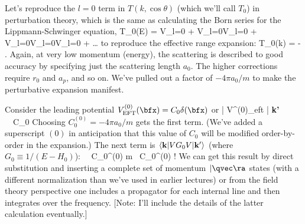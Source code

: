 Let's reproduce the $l=0$ term in $T(k,\cos\theta)$ (which we'll call $T_0$) 
in perturbation theory,
which is the same as calculating
the Born series for the Lippmann-Schwinger equation,
\beq
   T_0(E) = V_{l=0} + V_{l=0}V_{l=0} 
   + V_{l=0}V_{l=0}V_{l=0} + \ldots
\eeq
to reproduce the effective range expansion:
%
\beq 
   T_0(k) = -  \;.
\eeq
Again, at very low momentum (energy), the scattering is described to
good accuracy by specifying just the scattering length $a_0$.
The higher corrections require $r_0$ and $a_p$, and so on.
We've pulled out a factor of $-4\pi a_0/m$ to make the perturbative
expansion manifest.

Consider the leading potential
$V^{(0)}_{\rm EFT}(\bfx) = C_0 \delta(\bfx)$ or
\beq
  | V^{(0)}_{\rm eft} | {\bf k'}\rangle
  \ \Longrightarrow\
 \ \Longrightarrow\ C_0
\eeq
Choosing $C_0^{(0)} = -4\pi a_0/m$ gets the first term. 
(We've added a superscript $(0)$ in anticipation that this value of
$C_0$ will be modified order-by-order in the expansion.) 
The next term is  
      $\langle {\bf k} | VG_0V | {\bf k'}\rangle$ (where
      $G_0 \equiv 1/(E-H_0)$):
\beq
{}
 \ \Longrightarrow\ 
C_0^{(0)} m \int\! \frac{d^3q}{(2\pi)^3} \, C_0^{(0)}
   \longrightarrow \infty!
   \label{eq:C0sq_bare}
\eeq
We can get this result by direct substitution and inserting a complete
set of momentum $|\qvec\ra$ states (with a different normalization than
we've used in earlier lectures) or from the field theory perspective
one includes a propagator for each internal line and then integrates
over the frequency. [Note: I'll include the details of the latter calculation
eventually.]

